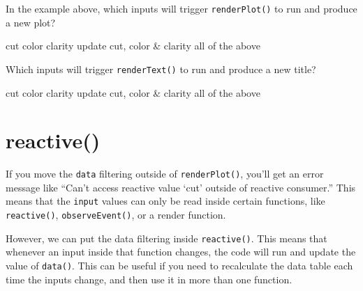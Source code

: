 \documentclass[
]{book}
\begin{document}
In the example above, which inputs will trigger \texttt{renderPlot()} to run and produce a new plot?

cut color clarity update cut, color \& clarity all of the above

Which inputs will trigger \texttt{renderText()} to run and produce a new title?

cut color clarity update cut, color \& clarity all of the above

\hypertarget{reactive-1}{%
\section{reactive()}\label{reactive-1}}

If you move the \texttt{data} filtering outside of \texttt{renderPlot()}, you'll get an error message like ``Can't access reactive value `cut' outside of reactive consumer.'' This means that the \texttt{input} values can only be read inside certain functions, like \texttt{reactive()}, \texttt{observeEvent()}, or a render function.

However, we can put the data filtering inside \texttt{reactive()}. This means that whenever an input inside that function changes, the code will run and update the value of \texttt{data()}. This can be useful if you need to recalculate the data table each time the inputs change, and then use it in more than one function.
\end{document}
